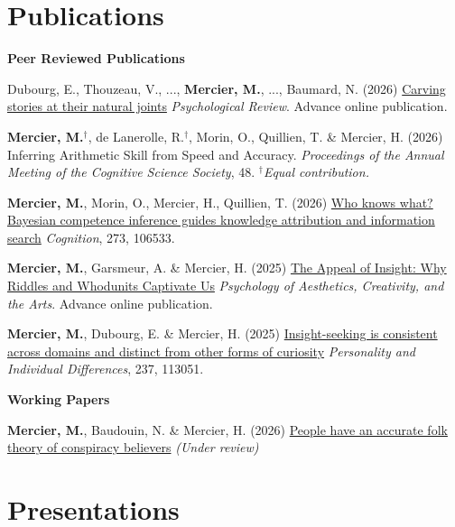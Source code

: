 \documentclass[letterpaper,11pt]{article}
\newcommand{\resumeItem}[1]{
  \item\small{
    {#1 \vspace{-2pt}}
  }
}
\newcommand{\resumePublicationHeading}[1]{
  \vspace{5pt} %
  \noindent\textbf{\small #1} %
  \vspace{2pt} %
}
\begin{document}
\section{Publications}


\small

\resumePublicationHeading{Peer Reviewed Publications}
\begin{etaremune}
    \resumeItem{Dubourg, E., Thouzeau, V., ..., \textbf{Mercier, M.}, ..., Baumard, N. (2026) \href{https://doi.org/10.1037/rev0000648}{Carving stories at their natural joints} \emph{Psychological Review}. Advance online publication.}
    \resumeItem{\textbf{Mercier, M.}$^\dagger$, de Lanerolle, R.$^\dagger$, Morin, O., Quillien, T. \& Mercier, H. (2026) Inferring Arithmetic Skill from Speed and Accuracy. \emph{Proceedings of the Annual Meeting of the Cognitive Science Society}, 48. \textit{$^\dagger$Equal contribution.}}
    \resumeItem{\textbf{Mercier, M.}, Morin, O., Mercier, H., Quillien, T. (2026) \href{https://doi.org/10.1016/j.cognition.2026.106533}{Who knows what? Bayesian competence inference guides knowledge attribution and information search} \emph{Cognition}, 273, 106533.}
    \resumeItem{\textbf{Mercier, M.}, Garsmeur, A. \& Mercier, H. (2025) \href{https://doi.org/10.1037/aca0000773}{The Appeal of Insight: Why Riddles and Whodunits Captivate Us} \emph{Psychology of Aesthetics, Creativity, and the Arts}. Advance online publication.}
    \resumeItem{\textbf{Mercier, M.}, Dubourg, E. \& Mercier, H. (2025) \href{https://doi.org/10.1016/j.paid.2025.113051}{Insight-seeking is consistent across domains and distinct from other forms of curiosity} \emph{Personality and Individual Differences}, 237, 113051.}
\end{etaremune}


\resumePublicationHeading{Working Papers}
\begin{etaremune}
    \resumeItem{\textbf{Mercier, M.}, Baudouin, N. \& Mercier, H. (2026) \href{https://doi.org/10.31234/osf.io/mp27u_v3}{People have an accurate folk theory of conspiracy believers} \emph{(Under review)}}
\end{etaremune}


\section{Presentations}
\end{document}
